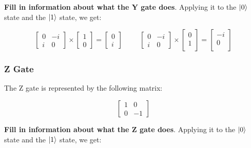 \documentclass{article}
\begin{document}
\textbf{Fill in information about what the Y gate does}. Applying it to the $\ket{0}$ state and the $\ket{1}$ state, we get:

\begin{center}
	\[
		\begin{bmatrix}
			0 & -i \\
			i & 0
		\end{bmatrix}
		\times
		\begin{bmatrix}
			1 \\
			0
		\end{bmatrix}
		=
		\begin{bmatrix}
			0 \\
			i
		\end{bmatrix}
		\hspace{1cm}
		\begin{bmatrix}
			0 & -i \\
			i & 0
		\end{bmatrix}
		\times
		\begin{bmatrix}
			0 \\
			1 \\
		\end{bmatrix}
		=
		\begin{bmatrix}
			-i \\
			0 \\
		\end{bmatrix}
	\]
\end{center}

\subsubsection{Z Gate}
\label{sec:zgate}

The Z gate is represented by the following matrix:

\begin{center}
	\[
		\begin{bmatrix}
			1 & 0 \\
			0 & -1
		\end{bmatrix}
	\]
\end{center}

\textbf{Fill in information about what the Z gate does}. Applying it to the $\ket{0}$ state and the $\ket{1}$ state, we get:
\end{document}

